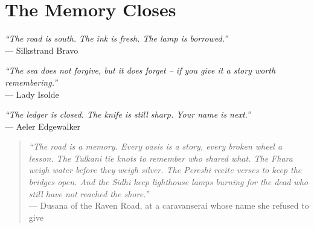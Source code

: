 \documentclass[12pt,oneside]{book}
\begin{document}
\chapter*{The Memory Closes}

\noindent
\textit{``The road is south. The ink is fresh. The lamp is borrowed.''} \\
\hfill --- Silkstrand Bravo

\vspace{0.5em}
\noindent
\textit{``The sea does not forgive, but it does forget -- if you give it a story worth remembering.''} \\
\hfill --- Lady Isolde

\vspace{0.5em}
\noindent
\textit{``The ledger is closed. The knife is still sharp. Your name is next.''} \\
\hfill --- Aeler Edgewalker

\vspace{2em}
\begin{quote}
  \small
  \textit{``The road is a memory. Every oasis is a story, every broken wheel a lesson. The Tulkani tie knots to remember who shared what. The Fhara weigh water before they weigh silver. The Pereshi recite verses to keep the bridges open. And the Sidhi keep lighthouse lamps burning for the dead who still have not reached the shore.''}
  \\ --- Dusana of the Raven Road, at a caravanserai whose name she refused to give
\end{quote}
\end{document}
